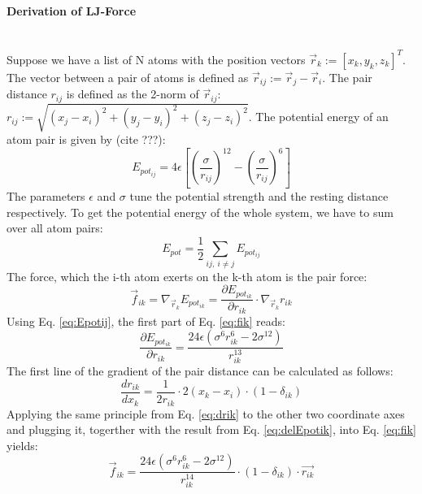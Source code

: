\paragraph{Derivation of LJ-Force}\mbox{}\\
Suppose we have a list of N atoms with the position vectors $\vec{r}_k:=[x_k, y_k, z_k]^T$. The vector between a pair of atoms is defined as $\vec{r}_{ij}:=\vec{r}_j-\vec{r}_i$. The pair distance $r_{ij}$ is defined as the 2-norm of $\vec{r}_{ij}$:\\$r_{ij}:=\sqrt{(x_j-x_i)^2+(y_j-y_i)^2+(z_j-z_i)^2}$. The potential energy of an atom pair is given by (cite ???):
\begin{equation}
	E_{pot_{ij}} = 4\epsilon\left[\left(\dfrac{\sigma}{r_{ij}}\right)^{12}-
	\left(\dfrac{\sigma}{r_{ij}}\right)^{6}\right]\label{eq:Epotij}
\end{equation}
The parameters $\epsilon$ and $\sigma$ tune the potential strength and the resting distance respectively. To get the potential energy of the whole system, we have to sum over all atom pairs:
\begin{equation}
E_{pot}=\dfrac{1}{2}\sum_{ij,~i\neq j}E_{pot_{ij}}
\end{equation}
The force, which the i-th atom exerts on the k-th atom is the pair force:
\begin{equation}
\vec{f}_{ik}=\nabla_{\vec{r}_k} E_{pot_{ik}}=\dfrac{\partial E_{pot_{ik}}}{\partial r_{ik}}\cdot
\nabla_{\vec{r}_k}r_{ik} \label{eq:fik}
\end{equation}
Using Eq. \eqref{eq:Epotij}, the first part of Eq. \eqref{eq:fik} reads:
\begin{equation}
\dfrac{\partial E_{pot_{ik}}}{\partial r_{ik}} = \dfrac{24\epsilon (\sigma^6 r_{ik}^6-2\sigma^{12})}{r_{ik}^{13}}\label{eq:delEpotik}
\end{equation}
The first line of the gradient of the pair distance can be calculated as follows:
\begin{equation}
\dfrac{dr_{ik}}{dx_k}=\dfrac{1}{2r_{ik}}\cdot 2(x_k-x_i)\cdot (1-\delta_{ik}) \label{eq:drik}
\end{equation}
Applying the same principle from Eq. \eqref{eq:drik} to the other two coordinate axes and plugging it, togerther with the result from Eq. \eqref{eq:delEpotik}, into Eq. \eqref{eq:fik} yields:
\begin{equation}
\vec{f}_{ik}=\dfrac{24\epsilon (\sigma^6 r_{ik}^6-2\sigma^{12})}{r_{ik}^{14}}\cdot(1-\delta_{ik})\cdot\vec{r_{ik}}\label{eq:fikf}
\end{equation}













